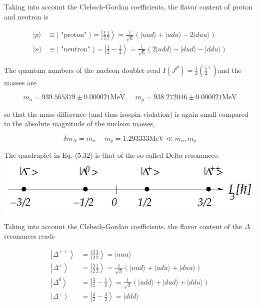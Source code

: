 \documentclass[10pt, letterpaper]{article}
\begin{document}
Taking into account the Clebsch-Gordan coefficients, the flavor content of proton and neutron is

$$
\begin{aligned}
|p\rangle & \equiv \mid \text { "proton" }\rangle=\left|\frac{1}{2} \frac{1}{2}\right\rangle=\frac{1}{\sqrt{6}}(|u u d\rangle+|u d u\rangle-2|d u u\rangle) \\
|n\rangle & \equiv \mid \text { "neutron" }\rangle=\left|\frac{1}{2}-\frac{1}{2}\right\rangle=\frac{1}{\sqrt{6}}(2|u d d\rangle-|d u d\rangle-|d d u\rangle)
\end{aligned}
$$

The quantum numbers of the nucleon doublet read $I\left(J^{P}\right)=\frac{1}{2}\left(\frac{1}{2}^{+}\right)$and the masses are

$$
m_{n}=939.565379 \pm 0.000021 \mathrm{MeV}, \quad m_{p}=938.272046 \pm 0.000021 \mathrm{MeV}
$$

so that the mass difference (and thus isospin violation) is again small compared to the absolute magnitude of the nucleon masses,

$$
\delta m_{N}=m_{n}-m_{p}=1.293333 \mathrm{MeV} \ll m_{n}, m_{p}
$$

The quadruplet in Eq. (5.32) is that of the so-called Delta resonances:\\
\includegraphics[scale=0.3, center]{2025_05_20_8618f55a41bfe980b4b2g-66}

Taking into account the Clebsch-Gordan coefficients, the flavor content of the $\Delta$ resonances reads

$$
\begin{aligned}
\left|\Delta^{++}\right\rangle & =\left|\frac{3}{2} \frac{3}{2}\right\rangle=|u u u\rangle \\
\left|\Delta^{+}\right\rangle & =\left|\frac{3}{2} \frac{1}{2}\right\rangle=\frac{1}{\sqrt{3}}(|u u d\rangle+|u d u\rangle+|d u u\rangle) \\
\left|\Delta^{0}\right\rangle & =\left|\frac{3}{2}-\frac{1}{2}\right\rangle=\frac{1}{\sqrt{3}}(|u d d\rangle+|d u d\rangle+|d d u\rangle) \\
\left|\Delta^{-}\right\rangle & =\left|\frac{3}{2}-\frac{3}{2}\right\rangle=|d d d\rangle
\end{aligned}
$$
\end{document}
